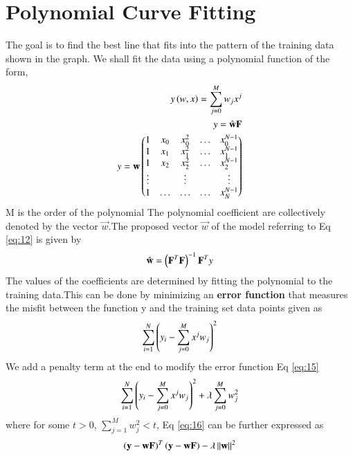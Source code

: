 \documentclass[journal,12pt,twocolumn]{IEEEtran}
\begin{document}
\section{Polynomial Curve Fitting}
The goal is to find the best line that fits into the  pattern of the training data shown in the graph.
We shall fit the data using a polynomial function of the form, 
\begin{align}
     y\left(w,x\right)= \sum_{j=0}^{M} w_j x^{j}\\
     y = \hat{\mathbf{w}}\mathbf{F}\\
     y = \mathbf{w}\begin{pmatrix} 1 & x_{0} & x_{0}^2 & \ldots & x_{0}^{N-1} \\
		1 & x_{1} & x_{1}^2 & \ldots & x_{1}^{N-1} \\
		1 & x_{2} & x_{2}^2 & \ldots & x_{2}^{N-1} \\
		\vdots & & \vdots &  & \vdots  \\
		    1 & \ldots & \ldots & \ldots & x_{N}^{N-1} \end{pmatrix}
\end{align}
M is the order of the polynomial
The polynomial coefficient are collectively denoted by the vector $\vec{w}$.The proposed vector $\vec{w}$ of the model referring to Eq \eqref{eq:12} is given by 
\begin{align}
    \hat{\mathbf{w}} = \left(\mathbf{F}^T\mathbf{F}\right)^{-1}\mathbf{F}^Ty \label{eq:13}
\end{align}
The values of the coefficients are determined by fitting the polynomial to the
training data.This can be done by minimizing an \textbf{error function} that measures the
misfit between the function y and the training set data points given as
\begin{align}
    \sum_{i=1}^{N}\left(y_{i} - \sum_{j=0}^{M}x^{j}w_{j}\right)^2 \label{eq:15}
\end{align}
We add a penalty term at the end to modify the error function Eq \eqref{eq:15}
\begin{align}
    \sum_{i=1}^{N}\left(y_{i} - \sum_{j=0}^{M}x^{j}w_{j}\right)^2 + \lambda\sum_{j=0}^{M}w_{j}^2\label{eq:16}
\end{align}
where for some  $t>0$, $\sum_{j=1}^{M}w_{j}^2<t$, 
Eq \eqref{eq:16} can be further expressed as
\begin{align}
    \left(\mathbf{y} - \mathbf{wF}\right)^T\left(\mathbf{y} - \mathbf{wF}\right) - \lambda\left\lVert\mathbf{w}\right\rVert^2\label{eq:17}
\end{align}
\end{document}
